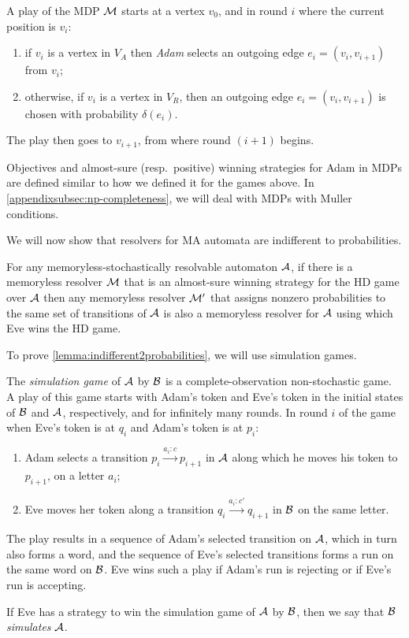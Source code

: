 A play of the MDP $\mathcal{M}$ starts at a vertex $v_0$, and in round $i$ where the current position is $v_i$:
\begin{enumerate}
    \item if $v_i$ is a vertex in $V_A$ then \emph{Adam} selects an outgoing edge $e_i=(v_i,v_{i+1})$ from $v_i$;
    \item otherwise, if $v_i$ is a vertex in $V_R$, then an outgoing edge $e_i=(v_i,v_{i+1})$ is chosen with probability $\delta(e_i)$. 
\end{enumerate}
The play then goes to $v_{i+1}$, from where round $(i+1)$ begins.

Objectives and almost-sure (resp.\ positive) winning strategies for Adam in MDPs are defined similar to how we defined it for the games above. In \cref{appendixsubsec:np-completeness}, we will deal with MDPs with Muller conditions.

We will now show that resolvers for MA automata are indifferent to probabilities.
\begin{lemma}\label{lemma:indifferent2probabilities}
For any memoryless-stochastically resolvable automaton $\mathcal{A}$, if there is a memoryless resolver $\mathcal{M}$ that is an almost-sure winning strategy for the HD game over $\mathcal{A}$ then any memoryless resolver $\mathcal{M}'$ that assigns nonzero probabilities to the same set of transitions of $\mathcal{A}$ is also a memoryless resolver for $\mathcal{A}$ using which Eve wins the HD game. 
\end{lemma}
To prove \cref{lemma:indifferent2probabilities}, we will use simulation games.

\begin{definition}\label{df:simulation-game}
        The \emph{simulation game} of $\mathcal{A}$ by $\mathcal{B}$ is a complete-observation non-stochastic game. A play of this game starts with Adam's token and Eve's token in the initial states of $\mathcal{B}$ and $\mathcal{A}$, respectively, and for infinitely many rounds. In round $i$ of the game when Eve's token is at $q_i$ and Adam's token is at $p_i$: 
    \begin{enumerate}
        \item Adam selects a transition $p_i \xrightarrow{a_i:c} p_{i+1}$ in $\mathcal{A}$ along which he moves his token to $p_{i+1}$, on a letter $a_i$;
        \item Eve moves her token along a transition $q_i \xrightarrow{a_i: c'} q_{i+1}$ in $\mathcal{B}$ on the same letter.
    \end{enumerate}
The play results in a sequence of Adam's selected transition on $\mathcal{A}$, which in turn also forms a word, and the sequence of Eve's selected transitions forms a run on the same word on $\mathcal{B}$. Eve wins such a play if Adam's run is rejecting or if Eve's run is accepting. 
\end{definition}
If Eve has a strategy to win the simulation game of $\mathcal{A}$ by $\mathcal{B}$, then we say that $\mathcal{B}$ \emph{simulates} $\mathcal{A}$. 

